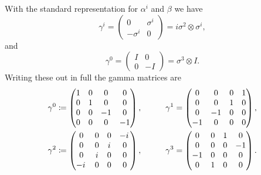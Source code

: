 \documentclass[fleqn]{NotesClass}
\newcommand{\ident}{I}
\begin{document}
    With the standard representation for \(\alpha^i\) and \(\beta\) we have
    \begin{equation}
        \gamma^i = 
        \begin{pmatrix}
            0 & \sigma^i\\
            -\sigma^i & 0
        \end{pmatrix}
        = i\sigma^2 \otimes \sigma^i,
    \end{equation}
    and
    \begin{equation}
        \gamma^0 = 
        \begin{pmatrix}
            \ident & 0\\
            0 & -\ident
        \end{pmatrix}
        = \sigma^3 \otimes \ident.
    \end{equation}
    Writing these out in full the gamma matrices are
    \begin{alignat}{3}
        \gamma^0 &\coloneqq 
        \begin{pmatrix}
            1 & 0 & 0 & 0\\
            0 & 1 & 0 & 0\\
            0 & 0 & -1 & 0\\
            0 & 0 & 0 & -1
        \end{pmatrix}
        , \qquad &
        \gamma^1 &= 
        \begin{pmatrix}
            0 & 0 & 0 & 1\\
            0 & 0 & 1 & 0\\
            0 & -1 & 0 & 0\\
            -1 & 0 & 0 & 0
        \end{pmatrix}
        ,\\
        \gamma^2 &\coloneqq 
        \begin{pmatrix}
            0 & 0 & 0 & \mathrlap{-i}\hphantom{-1}\\
            0 & 0 & i & 0\\
            0 & i & 0 & 0\\
            \mathrlap{-i}\hphantom{-1} & 0 & 0 & 0
        \end{pmatrix}
        , \qquad &
        \gamma^3 &= 
        \begin{pmatrix}
            0 & 0 & 1 & 0\\
            0 & 0 & 0 & -1\\
            -1 & 0 & 0 & 0\\
            0 & 1 & 0 & 0
        \end{pmatrix}
        .
    \end{alignat}
    
\end{document}
